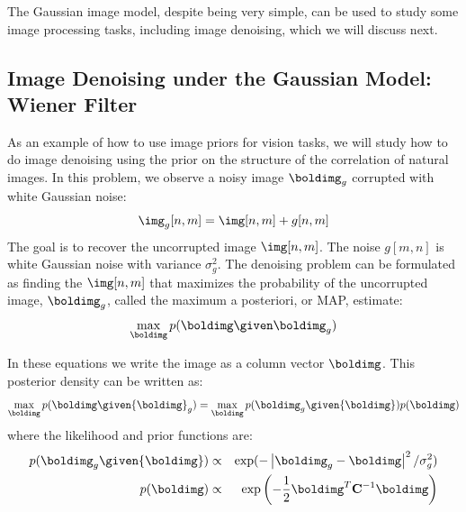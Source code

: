 %
%
%


The Gaussian image model, despite being very simple, can be used to study some image processing tasks, including image denoising, which we will discuss next.


\subsection{Image Denoising under the Gaussian Model: Wiener Filter}
\label{sec:image_denoising_gaussian_model}

As an example of how to use image priors for vision tasks, we will study how to do image denoising using the prior on the structure of the correlation of natural images. In this problem, we observe a noisy image $\boldimg_g$ corrupted with white Gaussian noise: 
\begin{equation}
\img_g[n, m] = \img[n, m] + g[n, m]
\end{equation}
The goal is to recover the uncorrupted image $\img [n,m]$. The noise $g[m, n]$ is white Gaussian noise with variance $\sigma_g^2$. The denoising problem can be formulated as finding the $\img [n,m]$ that maximizes the probability of the uncorrupted image, $\boldimg_g$, called the maximum a posteriori, or MAP, estimate:
\begin{equation}
\max_{\boldimg} p(\boldimg \given \boldimg_g) 
\end{equation}

In these equations we write the image as a column vector $\boldimg$. This posterior density can be written as:
\begin{equation}
\max_{\boldimg} p({\boldimg} \given {\boldimg}_g) = \max_{\boldimg} p({\boldimg}_g \given {\boldimg}) p({\boldimg})
\end{equation}
where the likelihood and prior functions are:
\begin{eqnarray}
p({\boldimg}_g \given {\boldimg}) & \propto & \exp( - \left| {\boldimg}_g - {\boldimg} \right| ^2 / \sigma_g^2) \\ 
p({\boldimg}) & \propto & \exp \left(-\frac{1}{2} {\boldimg}^T {\bf C}^{-1} {\boldimg} \right)
\end{eqnarray}

